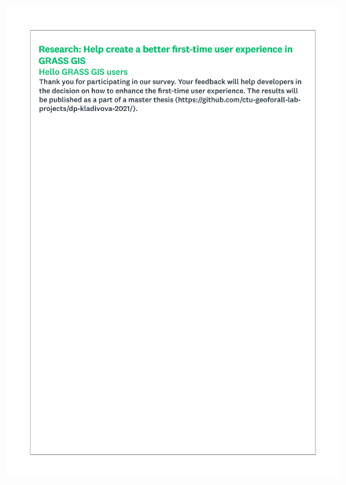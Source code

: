 \documentclass[a4paper,10pt,twoside]{article}
\begin{document}
 \begin{figure}[hbt!]
 \begin{center}
 \includegraphics[width=12.5cm]{../surveys/questionnaires/survey1_part2_page1_intro.pdf}
 \end{center}
 \end{figure}
\end{document}
